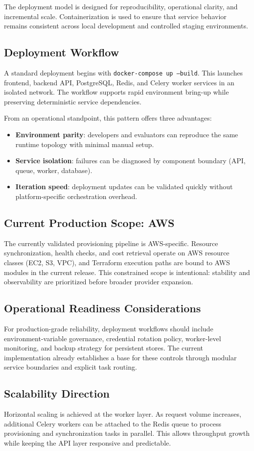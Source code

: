The deployment model is designed for reproducibility, operational clarity, and incremental scale. Containerization is used to ensure that service behavior remains consistent across local development and controlled staging environments.

\subsection{Deployment Workflow}
A standard deployment begins with \texttt{docker-compose up --build}. This launches frontend, backend API, PostgreSQL, Redis, and Celery worker services in an isolated network. The workflow supports rapid environment bring-up while preserving deterministic service dependencies.

From an operational standpoint, this pattern offers three advantages:
\begin{itemize}
    \item \textbf{Environment parity}: developers and evaluators can reproduce the same runtime topology with minimal manual setup.
    \item \textbf{Service isolation}: failures can be diagnosed by component boundary (API, queue, worker, database).
    \item \textbf{Iteration speed}: deployment updates can be validated quickly without platform-specific orchestration overhead.
\end{itemize}

\subsection{Current Production Scope: AWS}
The currently validated provisioning pipeline is AWS-specific. Resource synchronization, health checks, and cost retrieval operate on AWS resource classes (EC2, S3, VPC), and Terraform execution paths are bound to AWS modules in the current release. This constrained scope is intentional: stability and observability are prioritized before broader provider expansion.

\subsection{Operational Readiness Considerations}
For production-grade reliability, deployment workflows should include environment-variable governance, credential rotation policy, worker-level monitoring, and backup strategy for persistent stores. The current implementation already establishes a base for these controls through modular service boundaries and explicit task routing.

\subsection{Scalability Direction}
Horizontal scaling is achieved at the worker layer. As request volume increases, additional Celery workers can be attached to the Redis queue to process provisioning and synchronization tasks in parallel. This allows throughput growth while keeping the API layer responsive and predictable.
